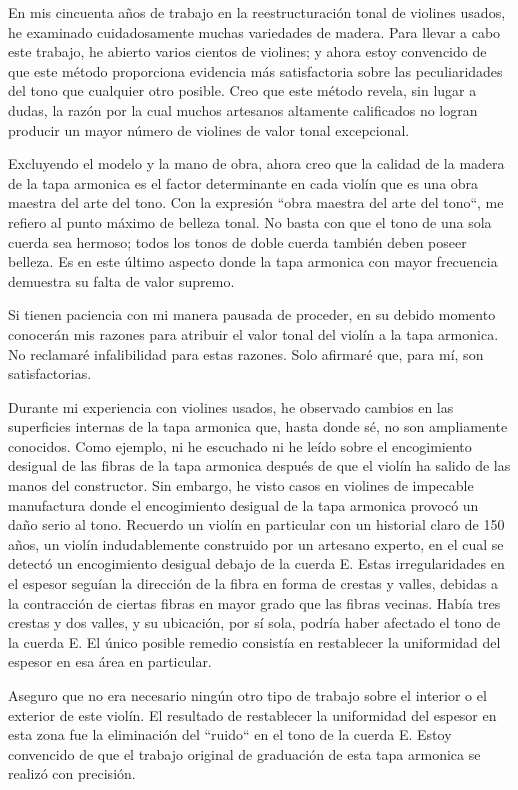 \documentclass[12pt]{book}
\begin{document}
En mis cincuenta años de trabajo en la reestructuración tonal de violines usados, he examinado cuidadosamente muchas variedades de madera. Para llevar a cabo este trabajo, he abierto varios cientos de violines; y ahora estoy convencido de que este método proporciona evidencia más satisfactoria sobre las peculiaridades del tono que cualquier otro posible. Creo que este método revela, sin lugar a dudas, la razón por la cual muchos artesanos altamente calificados no logran producir un mayor número de violines de valor tonal excepcional. 

Excluyendo el modelo y la mano de obra, ahora creo que la calidad de la madera de la tapa armonica es el factor determinante en cada violín que es una obra maestra del arte del tono. Con la expresión ``obra maestra del arte del tono``, me refiero al punto máximo de belleza tonal. No basta con que el tono de una sola cuerda sea hermoso; todos los tonos de doble cuerda también deben poseer belleza. Es en este último aspecto donde la tapa armonica con mayor frecuencia demuestra su falta de valor supremo. 

Si tienen paciencia con mi manera pausada de proceder, en su debido momento conocerán mis razones para atribuir el valor tonal del violín a la tapa armonica. No reclamaré infalibilidad para estas razones. Solo afirmaré que, para mí, son satisfactorias.

Durante mi experiencia con violines usados, he observado cambios en las superficies internas de la tapa armonica que, hasta donde sé, no son ampliamente conocidos. Como ejemplo, ni he escuchado ni he leído sobre el encogimiento desigual de las fibras de la tapa armonica después de que el violín ha salido de las manos del constructor. Sin embargo, he visto casos en violines de impecable manufactura donde el encogimiento desigual de la tapa armonica provocó un daño serio al tono. Recuerdo un violín en particular con un historial claro de 150 años, un violín indudablemente construido por un artesano experto, en el cual se detectó un encogimiento desigual debajo de la cuerda E. Estas irregularidades en el espesor seguían la dirección de la fibra en forma de crestas y valles, debidas a la contracción de ciertas fibras en mayor grado que las fibras vecinas. Había tres crestas y dos valles, y su ubicación, por sí sola, podría haber afectado el tono de la cuerda E. El único posible remedio consistía en restablecer la uniformidad del espesor en esa área en particular. 

Aseguro que no era necesario ningún otro tipo de trabajo sobre el interior o el exterior de este violín. El resultado de restablecer la uniformidad del espesor en esta zona fue la eliminación del ``ruido`` en el tono de la cuerda E. Estoy convencido de que el trabajo original de graduación de esta tapa armonica se realizó con precisión.
\end{document}
